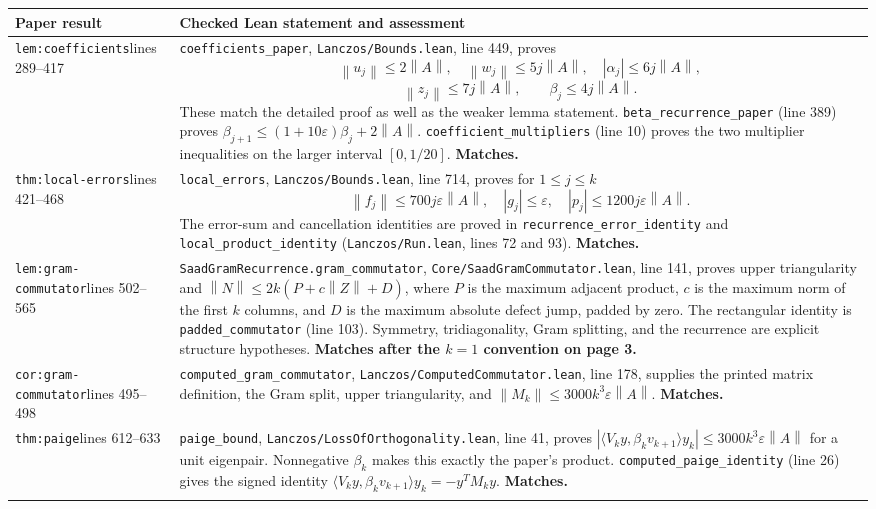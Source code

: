 \documentclass[10pt,a4paper]{article}
\newcommand{\code}[1]{{\small\nolinkurl{#1}}}
\newcommand{\norm}[1]{\left\lVert#1\right\rVert}
\newcommand{\eps}{\varepsilon}
\newcommand{\loc}[2]{\code{#1}, line #2}
\begin{document}
\begin{longtable}{@{}p{44mm}p{121.7mm}@{}}
\toprule
Paper result & Checked Lean statement and assessment\\\midrule
\code{lem:coefficients}\newline lines 289--417 &
\code{coefficients_paper}, \loc{Lanczos/Bounds.lean}{449}, proves
\[
\norm{u_j}\le2\norm A,\quad\norm{w_j}\le5j\norm A,\quad
|\alpha_j|\le6j\norm A,
\]
\[
\norm{z_j}\le7j\norm A,\qquad\beta_j\le4j\norm A.
\]
These match the detailed proof as well as the weaker lemma statement.
\code{beta_recurrence_paper} (line 389) proves
$\beta_{j+1}\le(1+10\eps)\beta_j+2\norm A$.
\code{coefficient_multipliers} (line 10) proves the two multiplier
inequalities on the larger interval $[0,1/20]$. \textbf{Matches.}\\\addlinespace

\code{thm:local-errors}\newline lines 421--468 &
\code{local_errors}, \loc{Lanczos/Bounds.lean}{714}, proves for $1\le j\le k$
\[
\norm{f_j}\le700j\eps\norm A,\quad |g_j|\le\eps,\quad
|p_j|\le1200j\eps\norm A.
\]
The error-sum and cancellation identities are proved in
\code{recurrence_error_identity} and \code{local_product_identity}
(\code{Lanczos/Run.lean}, lines 72 and 93). \textbf{Matches.}\\\addlinespace

\code{lem:gram-commutator}\newline lines 502--565 &
\code{SaadGramRecurrence.gram_commutator},
\loc{Core/SaadGramCommutator.lean}{141}, proves upper triangularity and
$\norm N\le2k(P+c\norm Z+D)$, where $P$ is the maximum adjacent product,
$c$ is the maximum norm of the first $k$ columns, and $D$ is the
maximum absolute defect jump, padded by zero. The rectangular identity is
\code{padded_commutator} (line 103). Symmetry, tridiagonality, Gram splitting,
and the recurrence are explicit structure hypotheses. \textbf{Matches after
the $k=1$ convention on page 3.}\\\addlinespace

\code{cor:gram-commutator}\newline lines 495--498 &
\code{computed_gram_commutator},
\loc{Lanczos/ComputedCommutator.lean}{178}, supplies the printed matrix
definition, the Gram split, upper triangularity, and
$\norm{M_k}\le3000k^3\eps\norm A$.
\textbf{Matches.}\\\addlinespace

\code{thm:paige}\newline lines 612--633 &
\code{paige_bound}, \loc{Lanczos/LossOfOrthogonality.lean}{41}, proves
$|\langle V_ky,\beta_kv_{k+1}\rangle y_k|
\le3000k^3\eps\norm A$ for a unit eigenpair.
Nonnegative $\beta_k$ makes this exactly the paper's product.
\code{computed_paige_identity} (line 26) gives the signed identity
$\langle V_ky,\beta_kv_{k+1}\rangle y_k=-y^TM_ky$.
\textbf{Matches.}\\\addlinespace


\end{longtable}
\end{document}
